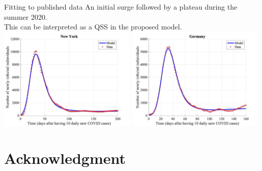 \documentclass[10pt]{beamer}
\begin{document}
\begin{frame}{Fitting to published data}
	An initial surge followed by a plateau during the summer 2020. \\ \vspace{0.5cm}
	This can be interpreted as a QSS in the proposed model. \\ \vspace{0.5cm}
	\includegraphics[width=0.49\textwidth]{epidemic-NewYork.jpeg} 
	\includegraphics[width=0.49\textwidth]{epidemic-Germany.jpeg} 
\end{frame}
\section{Acknowledgment}
\end{document}
